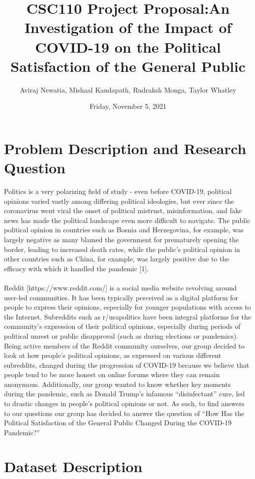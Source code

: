 \documentclass[fontsize=11pt]{article}
\title{CSC110 Project Proposal:An Investigation of the Impact of COVID-19 on the  Political Satisfaction of the General Public}
\author{Aviraj Newatia, Mishaal Kandapath, Rudraksh Monga, Taylor Whatley}
\date{Friday, November 5, 2021}
\begin{document}
\maketitle

\section*{Problem Description and Research Question}

Politics is a very polarizing field of study - even before COVID-19, political opinions varied vastly among differing political ideologies, but ever since the coronavirus went viral the onset of political mistrust, misinformation, and fake news has made the political landscape even more difficult to navigate. The public political opinion in countries such as Bosnia and Herzegovina, for example, was largely negative as many blamed the government for prematurely opening the border, leading to increased death rates, while the public’s political opinion in other countries such as China, for example, was largely positive due to the efficacy with which it handled the pandemic [1].
\\\\
Reddit [https://www.reddit.com/] is a social media website revolving around user-led communities. It has been typically perceived as a digital platform for people to express their opinions, especially for younger populations with access to the Internet. Subreddits such as r/usapolitics have been integral platforms for the community’s expression of their political opinions, especially during periods of political unrest or public disapproval (such as during elections or pandemics). Being active members of the Reddit community ourselves, our group decided to look at how people’s political opinions, as expressed on various different subreddits, changed during the progression of COVID-19 because we believe that people tend to be more honest on online forums where they can remain anonymous. Additionally, our group wanted to know whether key moments during the pandemic, such as Donald Trump’s infamous “disinfectant” cure, led to drastic changes in people’s political opinions or not. As such, to find answers to our questions our group has decided to answer the question of “How Has the Political Satisfaction of the General Public Changed During the COVID-19 Pandemic?”

\section*{Dataset Description}
\end{document}
